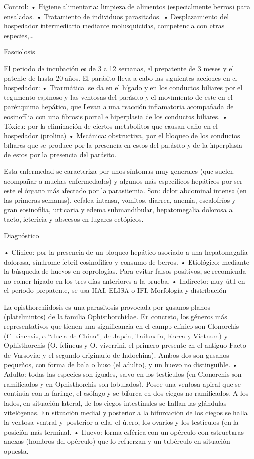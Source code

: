 Control:
• Higiene alimentaria: limpieza de alimentos (especialmente berros) para ensaladas.
• Tratamiento de individuos parasitados.
• Desplazamiento del hospedador intermediario mediante molusquicidas, competencia con otras especies,…

Fasciolosis

El periodo de incubación es de 3 a 12 semanas, el prepatente de 3 meses y el patente de hasta 20 años. El parásito lleva a cabo las siguientes acciones en el hospedador:
• Traumática: se da en el hígado y en los conductos biliares por el tegumento espinoso y las ventosas del parásito y el movimiento de este en el parénquima hepático, que llevan a una reacción inflamatoria acompañada de eosinofília con una fibrosis portal e hiperplasia de los conductos biliares.
• Tóxica: por la eliminación de ciertos metabolitos que causan daño en el hospedador (prolina)
• Mecánica: obstructiva, por el bloqueo de los conductos biliares que se produce por la presencia en estos del parásito y de la hiperplasia de estos por la presencia del parásito.

Esta enfermedad se caracteriza por unos síntomas muy generales (que suelen acompañar a muchas enfermedades) y algunos más específicos hepáticos por ser este el órgano más afectado por la parasitemia. Son: dolor abdominal intenso (en las primeras semanas), cefalea intensa, vómitos, diarrea, anemia, escalofríos y gran eosinofilia, urticaria y edema submandibular, hepatomegalia dolorosa al tacto, ictericia y abscesos en lugares ectópicos.

Diagnóstico

• Clínico: por la presencia de un bloqueo hepático asociado a una hepatomegalia dolorosa, síndrome febril eosinofílico y consumo de berros.
• Etiológico: mediante la búsqueda de huevos en coprologías. Para evitar falsos positivos, se recomienda no comer hígado en los tres días anteriores a la prueba. 
• Indirecto: muy útil en el periodo prepatente, se usa HAI, ELISA o IFI.
\newpage
Morfología y distribución

La opisthorchiidosis es una parasitosis provocada por gusanos planos (platelmintos) de la familia Ophisthorchidae. En concreto, los géneros más representativos que tienen una significancia en el campo clínico son Clonorchis (C. sinensis, o “duela de China”, de Japón, Tailandia, Korea y Vietnam) y Ophisthorchis (O. felineus y O. viverrini, el primero presente en el antiguo Pacto de Varsovia; y el segundo originario de Indochina).
Ambos dos son gusanos pequeños, con forma de bala o huso (el adulto), y un huevo no distinguible.
• Adulto: todas las especies son iguales, salvo en los testículos (en Clonorchis son ramificados y en Ophisthorchis son lobulados). Posee una ventosa apical que se continúa con la faringe, el esófago y se bifurca en dos ciegos no ramificados. A los lados, en situación lateral, de los ciegos intestinales se hallan las glándulas vitelógenas. En situación medial y posterior a la bifurcación de los ciegos se halla la ventosa ventral y, posterior a ella, el útero, los ovarios y los testículos (en la posición más terminal.
• Huevo: forma esférica con un opérculo con estructuras anexas (hombros del opérculo) que lo refuerzan y un tubérculo en situación opuesta.

